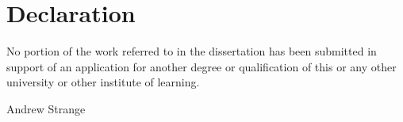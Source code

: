 \chapter*{Declaration}


No portion of the work referred to in the dissertation has been submitted in support of an application for another degree or qualification of this or any other university or other institute of learning.

\begin{flushright}
Andrew Strange
\end{flushright}


\cleardoublepage

\endinput
